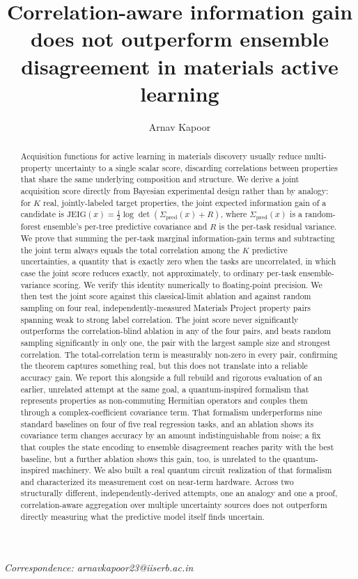 \documentclass[10pt]{article}
\title{\Large Correlation-aware information gain does not outperform ensemble disagreement in materials active learning}
\author[1]{Arnav Kapoor\orcidlink{0009-0007-9818-7908}}
\affil[1]{Indian Institute of Science Education and Research Bhopal, Bhopal 462066, India}
\date{}
\begin{document}
\maketitle
\begin{center}
\textit{Correspondence: arnavkapoor23@iiserb.ac.in}
\end{center}

\begin{abstract}
\noindent Acquisition functions for active learning in materials discovery usually reduce multi-property uncertainty to a single scalar score, discarding correlations between properties that share the same underlying composition and structure. We derive a joint acquisition score directly from Bayesian experimental design rather than by analogy: for $K$ real, jointly-labeled target properties, the joint expected information gain of a candidate is $\mathrm{JEIG}(x) = \tfrac{1}{2}\log\det(\Sigma_{\mathrm{pred}}(x) + R)$, where $\Sigma_{\mathrm{pred}}(x)$ is a random-forest ensemble's per-tree predictive covariance and $R$ is the per-task residual variance. We prove that summing the per-task marginal information-gain terms and subtracting the joint term always equals the total correlation among the $K$ predictive uncertainties, a quantity that is exactly zero when the tasks are uncorrelated, in which case the joint score reduces exactly, not approximately, to ordinary per-task ensemble-variance scoring. We verify this identity numerically to floating-point precision. We then test the joint score against this classical-limit ablation and against random sampling on four real, independently-measured Materials Project property pairs spanning weak to strong label correlation. The joint score never significantly outperforms the correlation-blind ablation in any of the four pairs, and beats random sampling significantly in only one, the pair with the largest sample size and strongest correlation. The total-correlation term is measurably non-zero in every pair, confirming the theorem captures something real, but this does not translate into a reliable accuracy gain. We report this alongside a full rebuild and rigorous evaluation of an earlier, unrelated attempt at the same goal, a quantum-inspired formalism that represents properties as non-commuting Hermitian operators and couples them through a complex-coefficient covariance term. That formalism underperforms nine standard baselines on four of five real regression tasks, and an ablation shows its covariance term changes accuracy by an amount indistinguishable from noise; a fix that couples the state encoding to ensemble disagreement reaches parity with the best baseline, but a further ablation shows this gain, too, is unrelated to the quantum-inspired machinery. We also built a real quantum circuit realization of that formalism and characterized its measurement cost on near-term hardware. Across two structurally different, independently-derived attempts, one an analogy and one a proof, correlation-aware aggregation over multiple uncertainty sources does not outperform directly measuring what the predictive model itself finds uncertain.
\end{abstract}
\end{document}

